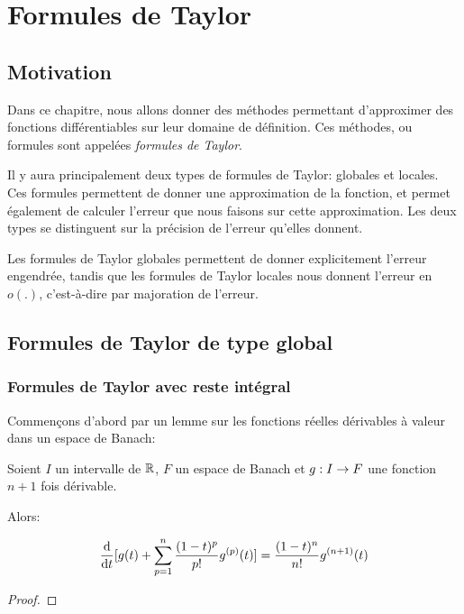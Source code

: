 \chapter{Formules de Taylor}

\section*{Motivation}

Dans ce chapitre, nous allons donner des méthodes permettant d'approximer des
fonctions différentiables sur leur domaine de définition. Ces méthodes, ou
formules sont appelées \textit{formules de Taylor}.

Il y aura principalement deux types de formules de Taylor: globales et locales.
Ces formules permettent de donner une approximation de la fonction, et permet
également de calculer l'erreur que nous faisons sur cette approximation. Les
deux types se distinguent sur la précision de l'erreur qu'elles donnent.

Les formules de Taylor globales permettent de donner explicitement l'erreur
engendrée, tandis que les formules de Taylor locales nous donnent l'erreur en
$o(.)$, c'est-à-dire par majoration de l'erreur.

\section{Formules de Taylor de type global}

\subsection{Formules de Taylor avec reste intégral}

Commençons d'abord par un lemme sur les fonctions réelles dérivables à valeur
dans un espace de Banach:

\begin{lemma}
	\label{lemma:taylor_formula_reste_derivative}
	Soient $I$ un intervalle de $\mathbb{R}$, $F$ un espace de Banach et
	$g : I \rightarrow F$ une fonction $n+1$ fois dérivable.

	Alors:

	\begin{equation*}
		\displaystyle \dv{t} [g(t) + \sum_{p = 1}^{n} \frac{(1 - t)^{p}}{p!}
		g^{(p)}(t)] = \frac{(1 - t)^{n}}{n!} g^{(n+1)}(t)
	\end{equation*}
\end{lemma}

\ifdefined\outputproof
\begin{proof}

\end{proof}
\fi

